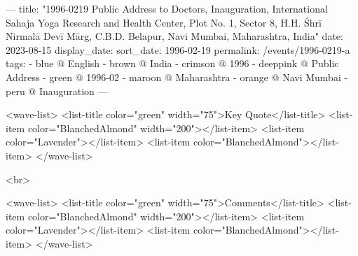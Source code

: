 ---
title: "1996-0219 Public Address to Doctors, Inauguration, International Sahaja Yoga Research and Health Center, Plot No. 1, Sector 8, H.H. Śhrī Nirmalā Devī Mārg, C.B.D. Belapur, Navi Mumbai, Maharashtra, India"
date: 2023-08-15
display_date: 
sort_date: 1996-02-19
permalink: /events/1996-0219-a
tags:
  - blue @ English
  - brown @ India
  - crimson @ 1996
  - deeppink @ Public Address
  - green @ 1996-02
  - maroon @ Maharashtra
  - orange @ Navi Mumbai
  - peru @ Inauguration
---

<wave-list>
  <list-title color="green" width="75">Key Quote</list-title>
  <list-item color="BlanchedAlmond"  width="200"></list-item>
  <list-item color="Lavender"></list-item>
  <list-item color="BlanchedAlmond"></list-item>
</wave-list>

<br>

<wave-list>
  <list-title color="green" width="75">Comments</list-title>
  <list-item color="BlanchedAlmond"  width="200"></list-item>
  <list-item color="Lavender"></list-item>
  <list-item color="BlanchedAlmond"></list-item>
</wave-list>